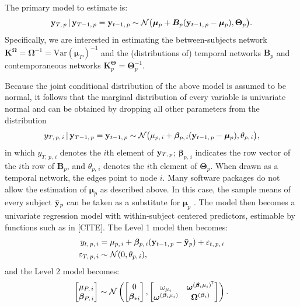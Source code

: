 The primary model to estimate is:
\begin{equation}
    \mathbf{y}_{T,\,p}\,|\,\mathbf{y}_{T-1,\,p} = \mathbf{y}_{t-1,\,p} \sim \mathcal{N} \big( \bm{\mu}_p + \bm{B}_p (\mathbf{y}_{t-1,\,p} - \bm{\mu}_p), \bm{\Theta}_p \big).
\end{equation}
Specifically, we are interested in estimating the between-subjects network $\bm{K}^{\bm{\Omega}} = \bm{\Omega}^{-1} = \text{Var}(\bm{\mu}_P)^{-1}$ and the (distributions of) temporal networks $\bm{B}_p$ and contemporaneous networks $\bm{K}_p^{\bm{\Theta}} = \bm{\Theta}_p^{-1}$. 

Because the joint conditional distribution of the above model is assumed to be normal, it follows that the marginal distribution of every variable is univariate normal and can be obtained by dropping all other parameters from the distribution
\begin{equation}
    y_{T,\,p,\,i}\,|\,\mathbf{y}_{T - 1,\,p} = \mathbf{y}_{t-1,\,p} \sim \mathcal{N} \big( \mu_{p,\,i} + \bm{\beta}_{p,\,i} (\mathbf{y}_{t-1,\,p} - \bm{\mu}_p ), \theta_{p,\,i} \big),
\end{equation}
in which $y_{T,\,p,\,i}$ denotes the $i$th element of $\mathbf{y}_{T,\,p}$; $\bm{\beta}_{p,\,i}$ indicates the row vector of the $i$th row of $\bm{B}_p$, and $\theta_{p,\,i}$ denotes the $i$th element of $\bm{\Theta}_p$. When drawn as a temporal network, the edges point to node $i$. Many software packages do not allow the estimation of $\bm{\mu}_p$ as described above. In this case, the sample means of every subject $\bar{\mathbf{y}}_p$ can be taken as a substitute for $\bm{\mu}_p$ \cite{hamaker2015center}. The model then becomes a univariate regression model with within-subject centered predictors, estimable by functions such as  in  [CITE]. The Level 1 model then becomes:
\begin{equation}
    \begin{split}
        y_{t,\,p,\,i} &= \mu_{p,\,i} + \bm{\beta}_{p,\,i} (\mathbf{y}_{t-1,\,p} - \bar{\mathbf{y}}_p) + \varepsilon_{t,\,p,\,i} \\
        \varepsilon_{T,\,p,\,i} &\sim \mathcal{N} (0, \theta_{p,\,i}), 
    \end{split}
\end{equation}
and the Level 2 model becomes:
\begin{equation}
    \begin{bmatrix}
        \mu_{P,\,i} \\
        \bm{\beta}_{P,\,i}
    \end{bmatrix}
    \sim \mathcal{N} \left(
    \begin{bmatrix}
        0 \\
        \bm{\beta}_{*i}
    \end{bmatrix} ,
    \begin{bmatrix}
        \omega_{\mu_{i}} & \bm{\omega}^{(\bm{\beta}_i \mu_i)^{\mkern-1.5mu\mathsf{T}}} \\
        \bm{\omega}^{(\bm{\beta}_i\mu_i)} & \bm{\Omega}^{(\bm{\beta}_i)}
    \end{bmatrix} \right).
\end{equation} 

